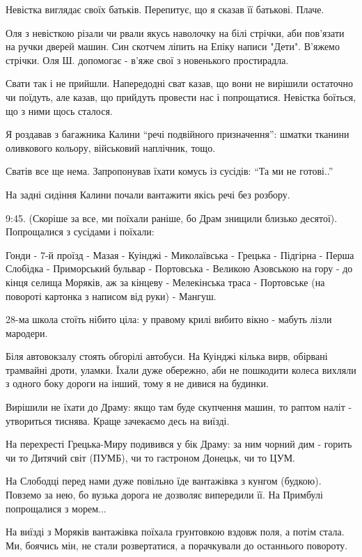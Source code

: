 Невістка виглядає своїх батьків. Перепитує, що я сказав її батькові. Плаче. 

Оля з невісткою різали чи рвали якусь наволочку на  білі стрічки, аби пов'язати
на ручки дверей машин. Син скотчем ліпить на Епіку написи "Дети". В'яжемо
стрічки. Оля Ш. допомогає - в'яже свої з новенького простирадла.

Свати так і не прийшли. Напередодні сват казав, що вони не вирішили остаточно
чи поїдуть, але казав, що прийдуть провести нас і попрощатися. Невістка
боїться, що з ними щось сталося.

Я роздавав з багажника Калини \enquote{речі подвійного призначення}: шматки тканини
оливкового кольору, військовий наплічник, тощо.

Сватів все ще нема. Запропонував їхати комусь із сусідів: \enquote{Та ми не готові..} 

На задні сидіння Калини почали вантажити якісь речі без розбору.

9:45. (Скоріше за все, ми поїхали раніше, бо Драм знищили близько десятої).
Попрощалися з сусідами і поїхали:

Гонди - 7-й проїзд - Мазая - Куінджі - Миколаївська - Грецька - Підгірна -
Перша Слобідка - Приморський бульвар - Портовська - Великою Азовською на гору -
до кінця селища Моряків, аж за кінцеву - Мелекінська траса - Портовське (на
повороті картонка з написом від руки) - Мангуш.

28-ма школа стоїть нібито ціла: у правому крилі вибито вікно - мабуть лізли
мародери.

Біля автовокзалу стоять обгорілі автобуси. На Куінджі кілька вирв, обірвані
трамвайні дроти, уламки. Їхали дуже обережно, аби не пошкодити колеса вихляли з
одного боку дороги на інший, тому я не дивися на будинки.


Вирішили не їхати до Драму: якщо там буде скупчення машин, то раптом наліт -
утвориться тиснява. Краще зачекаємо десь на виїзді.

На перехресті Грецька-Миру подивився у бік Драму: за ним чорний дим - горить чи
то Дитячий світ (ПУМБ), чи то  гастроном Донецьк, чи то ЦУМ.

На Слободці перед нами дуже повільно їде вантажівка з кунгом (будкою). Повземо
за нею, бо вузька дорога не дозволяє випередили її. На Примбулі попрощалися з
морем...

На виїзді з Моряків вантажівка поїхала грунтовкою вздовж поля, а потім стала.
Ми, боячись мін, не стали розвертатися, а порачкували до останнього повороту. 

